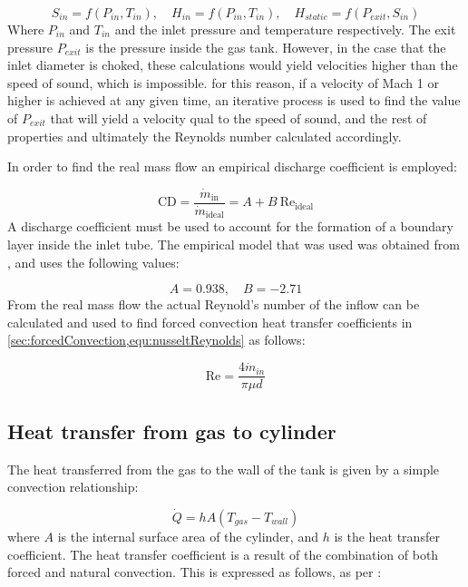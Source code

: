 \begin{equation}
S_{in} = f\left( P_{in}, T_{in} \right), \quad H_{in} = f\left( P_{in}, T_{in} \right), \quad H_{static} = f\left( P_{exit}, S_{in} \right)
\end{equation}
Where $P_{in}$ and $T_{in}$ and the inlet pressure and temperature respectively. The exit pressure $P_{exit}$ is the pressure inside the gas tank. However, in the case that the inlet diameter is choked, these calculations would yield velocities higher than the speed of sound, which is impossible. for this reason, if a velocity of Mach 1 or higher is achieved at any given time, an iterative process is used to find the value of $P_{exit}$ that will yield a velocity qual to the speed of sound, and the rest of properties and ultimately the Reynolds number calculated accordingly.

In order to find the real mass flow an empirical discharge coefficient is employed:

\begin{equation}
\text{CD} = \frac{\dot{m}_{\text{in}}}{\dot{m}_{\text{ideal}}} = A + B \:\text{Re}_{\text{ideal}} 
\end{equation}
A discharge coefficient must be used to account for the formation of a boundary layer inside the inlet tube. The empirical model that was used was obtained from , and uses the following values:

\begin{equation}
A =  0.938 ,  \quad B = -2.71
\end{equation}
From the real mass flow the actual Reynold's number of the inflow can be calculated and used to find forced convection heat transfer coefficients in \cref{sec:forcedConvection,equ:nusseltReynolds} as follows:

\begin{equation}
\text{Re} = \frac{4\dot m_{in}}{\pi \mu d}
\end{equation}




\subsection{Heat transfer from gas to cylinder}

The heat transferred from the gas to the wall of the tank is given by a simple convection relationship:

\begin{equation}
\label{equ:convection}
\dot Q = h A \left( T_{gas} - T_{wall}\right)
\end{equation}
where $A$ is the internal surface area of the cylinder, and $h$ is the heat transfer coefficient. The heat transfer coefficient is a result of the combination of both forced and natural convection. This is expressed as follows, as per \cite{ranong2011}:


